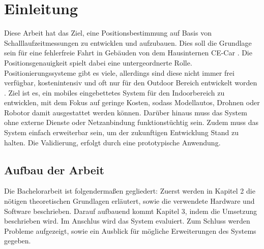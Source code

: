 \newpage
\section{Einleitung}

Diese Arbeit hat das Ziel, eine Positionsbestimmung auf Basis von Schalllaufzeitmessungen zu entwicklen und aufzubauen. Dies soll die Grundlage sein für eine fehlerfreie Fahrt in Gebäuden von dem Hausinternen CE-Car \cite{src_CE_CAR}. Die Positionsgenauigkeit spielt dabei eine untergeordnerte Rolle. Positionierungssysteme gibt es viele, allerdings sind diese nicht immer frei verfügbar, kostenintensiv und oft nur für den Outdoor Bereich entwickelt worden \cite{src_INDOOR_OUTDOOR}. Ziel ist es, ein mobiles eingebettetes System für den Indoorbereich zu entwicklen, mit dem Fokus auf geringe Kosten, sodass Modellautos, Drohnen oder Robotor damit ausgestattet werden können. Darüber hinaus muss das System ohne externe Dienste oder Netzanbindung funktionstüchtig sein. Zudem muss das System einfach erweiterbar sein, um der zukunftigen Entwicklung Stand zu halten. Die Validierung, erfolgt durch eine prototypische Anwendung.

\subsection{Aufbau der Arbeit}
Die Bachelorarbeit ist folgendermaßen gegliedert: Zuerst werden in Kapitel 2 die nötigen theoretischen Grundlagen erläutert, sowie die verwendete Hardware und Software beschrieben. Darauf aufbauend kommt Kapitel 3, indem die Umsetzung beschrieben wird. Im Anschlus wird das System evaluiert. Zum Schluss werden Probleme aufgezeigt, sowie ein Ausblick für mögliche Erweiterungen des Systems gegeben.
